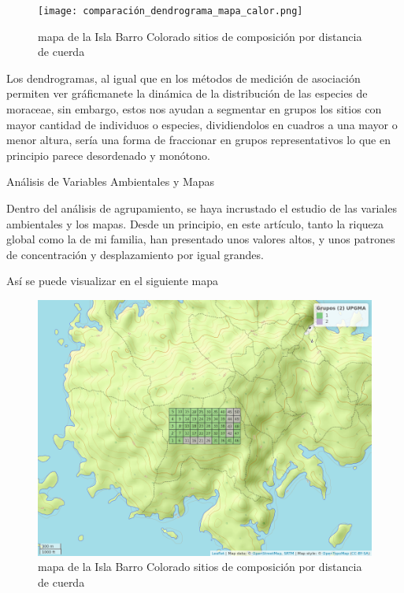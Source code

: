 \documentclass[11pt,]{article}
\begin{document}
\begin{figure}
\centering
\texttt{[image: comparación\_dendrograma\_mapa\_calor.png]}
\caption{mapa de la Isla Barro Colorado sitios de composición por
distancia de cuerda \label{fig:bci_map}}
\end{figure}

Los dendrogramas, al igual que en los métodos de medición de asociación
permiten ver gráficmanete la dinámica de la distribución de las especies
de moraceae, sin embargo, estos nos ayudan a segmentar en grupos los
sitios con mayor cantidad de individuos o especies, dividiendolos en
cuadros a una mayor o menor altura, sería una forma de fraccionar en
grupos representativos lo que en principio parece desordenado y
monótono.

Análisis de Variables Ambientales y Mapas

Dentro del análisis de agrupamiento, se haya incrustado el estudio de
las variales ambientales y los mapas. Desde un principio, en este
artículo, tanto la riqueza global como la de mi familia, han presentado
unos valores altos, y unos patrones de concentración y desplazamiento
por igual grandes.

Así se puede visualizar en el siguiente mapa

\begin{figure}
\centering
\includegraphics[width=1.00000\textwidth]{mapa_upgma_k2.png}
\caption{mapa de la Isla Barro Colorado sitios de composición por
distancia de cuerda \label{fig:bci_map}}
\end{figure}
\end{document}

